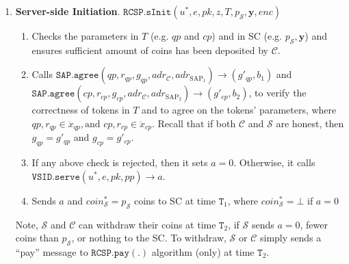\begin{enumerate}
\
\item \textbf{Server-side Initiation}\label{RCSP::Server-side-Initiation}. $\mathtt{RCSP}.\mathtt{sInit}(u^{\scriptscriptstyle *}, e, pk, z, T, p_{\scriptscriptstyle\mathcal{S}} ,\bm{y},enc)$

\begin{enumerate}

\item Checks the parameters  in $T$ (e.g. $qp$ and $cp$) and  in SC (e.g. $p_{\scriptscriptstyle\mathcal{S}}, \bm{y}$) and ensures sufficient amount of coins has been deposited by $\mathcal C$.  

\item Calls $\mathtt{SAP.agree}(qp,r_{\scriptscriptstyle qp},g_{\scriptscriptstyle qp},adr_{\scriptscriptstyle\mathcal{C}},adr_{\scriptscriptstyle\text{SAP}_{1}})\rightarrow (g'_{\scriptscriptstyle qp},b_{\scriptscriptstyle 1})$ and $\mathtt{SAP.agree}(cp,r_{\scriptscriptstyle cp},g_{\scriptscriptstyle cp},adr_{\scriptscriptstyle\mathcal{C}},adr_{\scriptscriptstyle\text{SAP}_{2}})\rightarrow (g'_{\scriptscriptstyle cp},b_{\scriptscriptstyle 2})$, to verify the correctness of tokens in $T$ and to agree on the tokens' parameters, where $qp,r_{\scriptscriptstyle qp}\in \ddot{x}_{\scriptscriptstyle qp}, \text{and }  cp,r_{\scriptscriptstyle cp} \in  \ddot{x}_{\scriptscriptstyle cp}$. Recall that if both $\mathcal{C}$ and $\mathcal{S}$ are honest, then $g_{\scriptscriptstyle qp}=g'_{\scriptscriptstyle qp}$ and $g_{\scriptscriptstyle cp}=g'_{\scriptscriptstyle cp}$. 




\item If any above check is rejected, then it sets $a=0$. Otherwise, it  calls $\mathtt{VSID.serve}(u^{\scriptscriptstyle *},e,pk, {pp})\rightarrow a$. 

\item Sends $a$ and $coin^{\scriptscriptstyle *}_{\scriptscriptstyle\mathcal S}=p_{\scriptscriptstyle\mathcal{S}}$ coins to SC at time $\texttt{T}_{\scriptscriptstyle 1}$, where  $coin^{\scriptscriptstyle *}_{\scriptscriptstyle\mathcal S}=\bot$ if $a=0$
\end{enumerate}
Note, $\mathcal S$  and  $\mathcal C$ can withdraw their coins at time $\texttt{T}_{\scriptscriptstyle 2}$, if  $\mathcal S$ sends $a=0$, fewer coins than $p_{\scriptscriptstyle\mathcal{S}}$, or nothing to the SC. To withdraw, $\mathcal S$  or  $\mathcal C$  simply sends a ``pay'' message to $\mathtt{RCSP}.\mathtt{pay}(.)$ algorithm (only) at time $\texttt{T}_{\scriptscriptstyle 2}$.


\end{enumerate}
